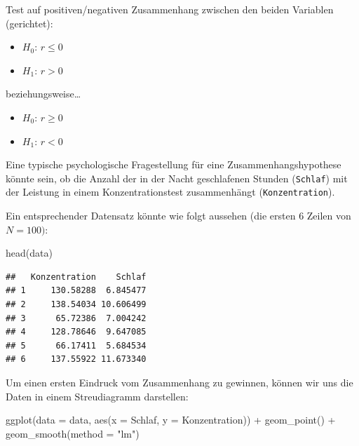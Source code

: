 \documentclass[
]{book}
\newenvironment{Shaded}{\begin{snugshade}}{\end{snugshade}}
\newcommand{\AttributeTok}[1]{\textcolor[rgb]{0.77,0.63,0.00}{#1}}
\newcommand{\FunctionTok}[1]{\textcolor[rgb]{0.00,0.00,0.00}{#1}}
\newcommand{\NormalTok}[1]{#1}
\newcommand{\SpecialCharTok}[1]{\textcolor[rgb]{0.00,0.00,0.00}{#1}}
\newcommand{\StringTok}[1]{\textcolor[rgb]{0.31,0.60,0.02}{#1}}
\providecommand{\tightlist}{%
  \setlength{\itemsep}{0pt}\setlength{\parskip}{0pt}}
\begin{document}
Test auf positiven/negativen Zusammenhang zwischen den beiden Variablen (gerichtet):

\begin{itemize}
\tightlist
\item
  \(H_0\): \(r \leq 0\)
\item
  \(H_1\): \(r > 0\)
\end{itemize}

beziehungsweise\ldots{}

\begin{itemize}
\tightlist
\item
  \(H_0\): \(r \geq 0\)
\item
  \(H_1\): \(r < 0\)
\end{itemize}

Eine typische psychologische Fragestellung für eine Zusammenhangshypothese könnte sein, ob die Anzahl der in der Nacht geschlafenen Stunden (\texttt{Schlaf}) mit der Leistung in einem Konzentrationstest zusammenhängt (\texttt{Konzentration}).

Ein entsprechender Datensatz könnte wie folgt aussehen (die ersten 6 Zeilen von \(N=100)\):

\begin{Shaded}
\begin{Highlighting}[]
\FunctionTok{head}\NormalTok{(data)}
\end{Highlighting}
\end{Shaded}

\begin{verbatim}
##   Konzentration    Schlaf
## 1     130.58288  6.845477
## 2     138.54034 10.606499
## 3      65.72386  7.004242
## 4     128.78646  9.647085
## 5      66.17411  5.684534
## 6     137.55922 11.673340
\end{verbatim}

Um einen ersten Eindruck vom Zusammenhang zu gewinnen, können wir uns die Daten in einem Streudiagramm darstellen:

\begin{Shaded}
\begin{Highlighting}[]
\FunctionTok{ggplot}\NormalTok{(}\AttributeTok{data =}\NormalTok{ data, }\FunctionTok{aes}\NormalTok{(}\AttributeTok{x =}\NormalTok{ Schlaf, }\AttributeTok{y =}\NormalTok{ Konzentration)) }\SpecialCharTok{+}
  \FunctionTok{geom\_point}\NormalTok{() }\SpecialCharTok{+}
  \FunctionTok{geom\_smooth}\NormalTok{(}\AttributeTok{method =} \StringTok{"lm"}\NormalTok{)}
\end{Highlighting}
\end{Shaded}
\end{document}
